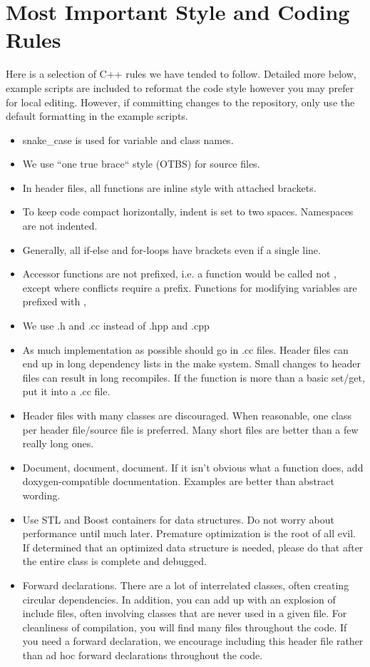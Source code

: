 \section{Most Important Style and Coding Rules}
Here is a selection of C++ rules we have tended to follow.  
Detailed more below, example scripts are included to reformat the code style however you may prefer for local editing.
However, if committing changes to the repository, only use the default formatting in the example scripts.
\begin{itemize}
\item snake\_case is used for variable and class names.
\item We use ``one true brace`` style (OTBS) for source files. 
\item In header files, all functions are inline style with attached brackets.
\item To keep code compact horizontally, indent is set to two spaces. Namespaces are not indented.
\item Generally, all if-else and for-loops have brackets even if a single line.
\item Accessor functions are not prefixed, i.e. a function would be called  not , except
where conflicts require a prefix. Functions for modifying variables are prefixed with ,
\item We use .h and .cc instead of .hpp and .cpp
\item As much implementation as possible should go in .cc files.
	Header files can end up in long dependency lists in the make system.  
	Small changes to header files can result in long recompiles.
	If the function is more than a basic set/get, put it into a .cc file.
\item Header files with many classes are discouraged.  When reasonable, one class per header file/source file is preferred.
	 Many short files are better than a few really long ones.
\item Document, document, document.  If it isn't obvious what a function does, add doxygen-compatible documentation.
	Examples are better than abstract wording.
\item Use STL and Boost containers for data structures.  Do not worry about performance until much later.
	Premature optimization is the root of all evil. If determined that an optimized data structure is needed,
	please do that after the entire class is complete and debugged.
\item Forward declarations.  There are a lot of interrelated classes, often creating circular dependencies. In addition, you can add up with an explosion of include files, often involving classes that are never used in a given  file.  For cleanliness of compilation, you will find many  files throughout the code. If you need a forward declaration, we encourage including this header file rather than ad hoc forward declarations throughout the code.
\end{itemize}

